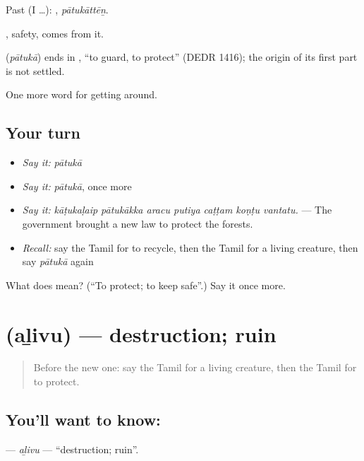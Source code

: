 Past (I …): , \emph{pātukāttēṉ}.

, safety, comes from it.

\begin{cousinweb}
\textbf{} (\emph{pātukā}) ends in , \textquotedblleft{}to guard, to protect\textquotedblright{} (DEDR 1416); the origin of its first part is not settled.
\end{cousinweb}

\begin{grammarlens}[title={What you've built}]
One more word for getting around.
\end{grammarlens}

\subsection*{Your turn}
\begin{itemize}
\raggedright
  \item \emph{Say it:} \emph{pātukā}
  \item \emph{Say it:} \emph{pātukā}, once more
  \item \emph{Say it:} \emph{kāṭukaḷaip pātukākka aracu putiya caṭṭam koṇṭu vantatu.} — The government brought a new law to protect the forests.
  \item \emph{Recall:} say the Tamil for to recycle, then the Tamil for a living creature, then say \emph{pātukā} again
\end{itemize}

\begin{tcolorbox}[breakable,colback=teal!4,colframe=teal!35!black,title={Before you move on}]
What does  mean? (\textquotedblleft{}To protect; to keep safe\textquotedblright{}.) Say it once more.
\end{tcolorbox}
\section[\texorpdfstring{\ta{அழிவு} (aḻivu)}{அழிவு (aḻivu)}]{ (aḻivu) — destruction; ruin}

\label{lesson:TA-C442-alivu}



\begin{quote}
Before the new one: say the Tamil for a living creature, then the Tamil for to protect.
\end{quote}

\subsection*{You'll want to know: }
\textbf{} — \emph{aḻivu} — \textquotedblleft{}destruction; ruin\textquotedblright{}.

